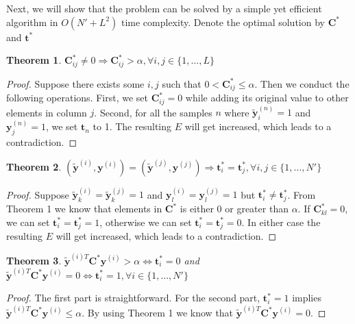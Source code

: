 \documentclass[10pt,twocolumn,letterpaper]{article}
\def\vec{\mathbf}
\def\mat{\mathbf}
\newtheorem{theorem}{Theorem}
\begin{document}
Next, we will show that the problem can be solved by a simple yet efficient algorithm in $O(N'+L^2)$ time complexity. Denote the optimal solution by $\mat{C}^*$ and $\vec{t}^*$
\begin{theorem}
$\mat{C}^*_{ij} \neq 0 \Rightarrow \mat{C}^*_{ij} > \alpha, \forall i,j \in \{1,\dots,L\}$
\end{theorem}
\begin{proof}
Suppose there exists some $i,j$ such that $0 < \mat{C}^*_{ij} \leq \alpha$. Then we conduct the following operations. First, we set $\mat{C}^*_{ij}=0$ while adding its original value to other elements in column $j$. Second, for all the samples $n$ where $\tilde{\vec{y}}^{(n)}_i=1$ and $\vec{y}^{(n)}_j=1$, we set $\vec{t}_n$ to 1. The resulting $E$ will get increased, which leads to a contradiction.
\end{proof}
\begin{theorem}
$(\tilde{\vec{y}}^{(i)},\vec{y}^{(i)})=(\tilde{\vec{y}}^{(j)},\vec{y}^{(j)}) \Rightarrow \vec{t}^*_i=\vec{t}^*_j, \forall i,j \in \{1,\dots,N'\}$
\end{theorem}
\begin{proof}
Suppose $\tilde{\vec{y}}^{(i)}_k=\tilde{\vec{y}}^{(j)}_k=1$ and $\vec{y}^{(i)}_l=\vec{y}^{(j)}_l=1$ but $\vec{t}^*_i \neq \vec{t}^*_j$. From Theorem 1 we know that elements in $\mat{C}^*$ is either 0 or greater than $\alpha$. If $\mat{C}^*_{kl}=0$, we can set $\vec{t}^*_i=\vec{t}^*_j=1$, otherwise we can set $\vec{t}^*_i=\vec{t}^*_j=0$. In either case the resulting $E$ will get increased, which leads to a contradiction.
\end{proof}
\begin{theorem}
$\tilde{\vec{y}}^{(i)T} \mat{C}^* \vec{y}^{(i)} > \alpha \Leftrightarrow \vec{t}^*_i=0$ and $\tilde{\vec{y}}^{(i)T} \mat{C}^* \vec{y}^{(i)} = 0 \Leftrightarrow \vec{t}^*_i=1, \forall i \in \{1,\dots,N'\}$
\end{theorem}
\begin{proof}
The first part is straightforward. For the second part, $\vec{t}^*_i=1$ implies $\tilde{\vec{y}}^{(i)T} \mat{C}^* \vec{y}^{(i)} \leq \alpha$. By using Theorem 1 we know that $\tilde{\vec{y}}^{(i)T} \mat{C}^* \vec{y}^{(i)} = 0$.
\end{proof}
\end{document}
